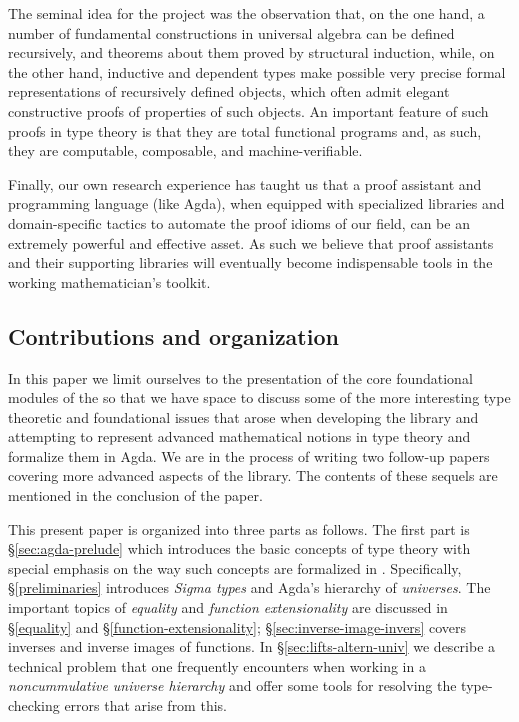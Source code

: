 
The seminal idea for the \agdaualib project was the observation that, on the one hand, a number of fundamental constructions in universal algebra can be defined recursively, and theorems about them proved by structural induction, while, on the other hand, inductive and dependent types make possible very precise formal representations of recursively defined objects, which often admit elegant constructive proofs of properties of such objects.  An important feature of such proofs in type theory is that they are total functional programs and, as such, they are computable, composable, and machine-verifiable.

Finally, our own research experience has taught us that a proof assistant and programming language (like Agda), when equipped with specialized libraries and domain-specific tactics to automate the proof idioms of our field, can be an extremely powerful and effective asset. As such we believe that proof assistants and their supporting libraries will eventually become indispensable tools in the working mathematician's toolkit.



\subsection{Contributions and organization}
\label{sec:contributions}

In this paper we limit ourselves to the presentation of the core foundational modules of the \ualib so that we have space to discuss some of the more interesting type theoretic and foundational issues that arose when developing the library and attempting to represent advanced mathematical notions in type theory and formalize them in Agda. We are in the process of writing two follow-up papers covering more advanced aspects of the library. The contents of these sequels are mentioned in the conclusion of the paper.

This present paper is organized into three parts as follows. The first part is \S\ref{sec:agda-prelude} which introduces the basic concepts of type theory with special emphasis on the way such concepts are formalized in \agda. Specifically, \S\ref{preliminaries} introduces \emph{Sigma types} and Agda's hierarchy of \emph{universes}. The important topics of \emph{equality} and \emph{function extensionality} are discussed in \S\ref{equality} and \S\ref{function-extensionality}; \S\ref{sec:inverse-image-invers} covers inverses and inverse images of functions. In \S\ref{sec:lifts-altern-univ} we describe a technical problem that one frequently encounters when working in a \emph{noncummulative universe hierarchy} and offer some tools for resolving the type-checking errors that arise from this.

